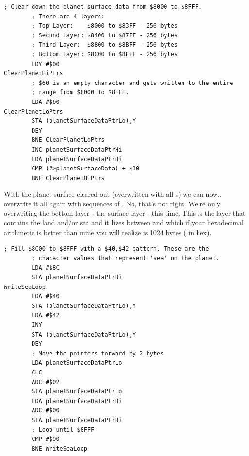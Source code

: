 \begin{lstlisting}[caption=The surface data is stored from \icode{\$8000} to \icode{\$8FFF}. This code overwrites it all with 
the value \$60\, which is an empty bitmap.]
        ; Clear down the planet surface data from $8000 to $8FFF.
        ; There are 4 layers:
        ; Top Layer:    $8000 to $83FF - 256 bytes 
        ; Second Layer: $8400 to $87FF - 256 bytes 
        ; Third Layer:  $8800 to $8BFF - 256 bytes 
        ; Bottom Layer: $8C00 to $8FFF - 256 bytes 
        LDY #$00
ClearPlanetHiPtrs   
        ; $60 is an empty character and gets written to the entire
        ; range from $8000 to $8FFF.
        LDA #$60
ClearPlanetLoPtrs   
        STA (planetSurfaceDataPtrLo),Y
        DEY
        BNE ClearPlanetLoPtrs
        INC planetSurfaceDataPtrHi
        LDA planetSurfaceDataPtrHi
        CMP (#>planetSurfaceData) + $10
        BNE ClearPlanetHiPtrs
\end{lstlisting}

%


With the planet surface cleared out (overwritten with all s) we can now.. overwrite it all again with sequences of
. No, that's not right. We're only overwriting the bottom layer - the surface layer - this time. This is the
layer that contains the land and/or sea and it lives between  and  which if your hexadecimal
arithmetic is better than mine you will realize is 1024 bytes ( in hex).

\begin{lstlisting}[caption=Filling the entire bottom surface of the planet with \icode{\$40,\$42}\, which gives us the sea. Our next step is
to overwrite some of this with land.]
        ; Fill $8C00 to $8FFF with a $40,$42 pattern. These are the
        ; character values that represent 'sea' on the planet.
        LDA #$8C
        STA planetSurfaceDataPtrHi
WriteSeaLoop   
        LDA #$40
        STA (planetSurfaceDataPtrLo),Y
        LDA #$42
        INY
        STA (planetSurfaceDataPtrLo),Y
        DEY
        ; Move the pointers forward by 2 bytes
        LDA planetSurfaceDataPtrLo
        CLC
        ADC #$02
        STA planetSurfaceDataPtrLo
        LDA planetSurfaceDataPtrHi
        ADC #$00
        STA planetSurfaceDataPtrHi
        ; Loop until $8FFF
        CMP #$90
        BNE WriteSeaLoop
\end{lstlisting}


